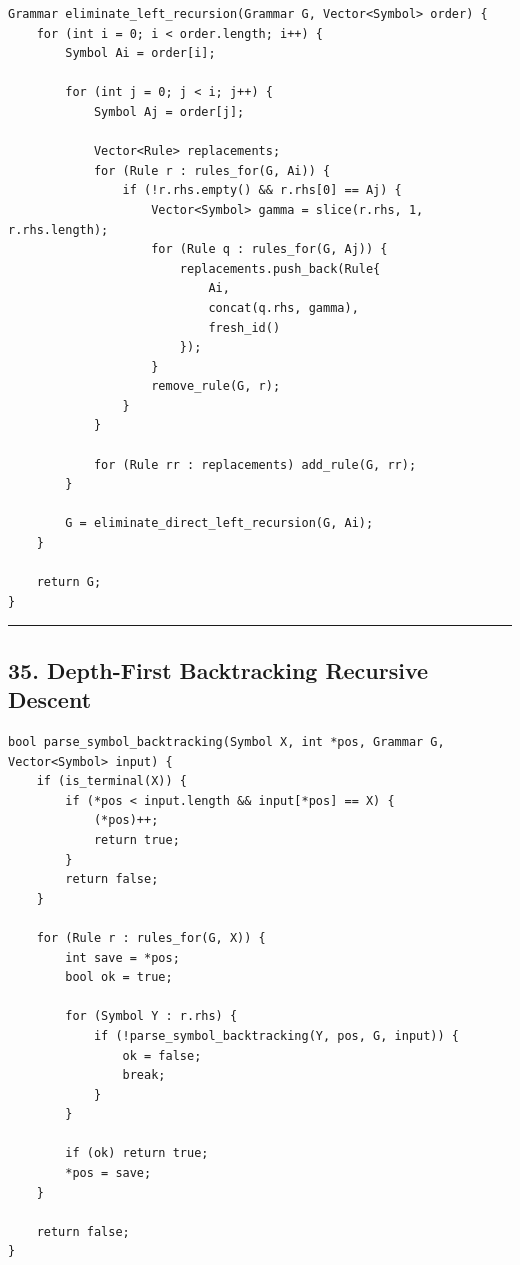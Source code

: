 \documentclass[10pt,letterpaper]{article}
\begin{document}
\begin{verbatim}
Grammar eliminate_left_recursion(Grammar G, Vector<Symbol> order) {
    for (int i = 0; i < order.length; i++) {
        Symbol Ai = order[i];

        for (int j = 0; j < i; j++) {
            Symbol Aj = order[j];

            Vector<Rule> replacements;
            for (Rule r : rules_for(G, Ai)) {
                if (!r.rhs.empty() && r.rhs[0] == Aj) {
                    Vector<Symbol> gamma = slice(r.rhs, 1, r.rhs.length);
                    for (Rule q : rules_for(G, Aj)) {
                        replacements.push_back(Rule{
                            Ai,
                            concat(q.rhs, gamma),
                            fresh_id()
                        });
                    }
                    remove_rule(G, r);
                }
            }

            for (Rule rr : replacements) add_rule(G, rr);
        }

        G = eliminate_direct_left_recursion(G, Ai);
    }

    return G;
}
\end{verbatim}

\medskip\hrule\medskip

\subsection*{35. Depth-First Backtracking Recursive Descent}

\begin{verbatim}
bool parse_symbol_backtracking(Symbol X, int *pos, Grammar G, Vector<Symbol> input) {
    if (is_terminal(X)) {
        if (*pos < input.length && input[*pos] == X) {
            (*pos)++;
            return true;
        }
        return false;
    }

    for (Rule r : rules_for(G, X)) {
        int save = *pos;
        bool ok = true;

        for (Symbol Y : r.rhs) {
            if (!parse_symbol_backtracking(Y, pos, G, input)) {
                ok = false;
                break;
            }
        }

        if (ok) return true;
        *pos = save;
    }

    return false;
}
\end{verbatim}
\end{document}
